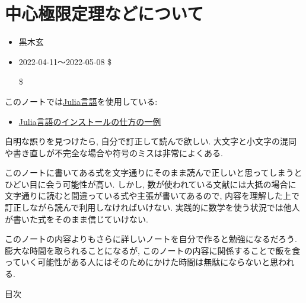 \documentclass[
  letterpaper,
  DIV=11,
  numbers=noendperiod]{scrartcl}
\author{}
\date{}
\providecommand{\tightlist}{%
  \setlength{\itemsep}{0pt}\setlength{\parskip}{0pt}}\usepackage{longtable,booktabs,array}
\begin{document}
\ifdefined\Shaded\renewenvironment{Shaded}{\begin{tcolorbox}[enhanced, breakable, borderline west={3pt}{0pt}{shadecolor}, sharp corners, boxrule=0pt, frame hidden, interior hidden]}{\end{tcolorbox}}\fi

\hypertarget{ux4e2dux5fc3ux6975ux9650ux5b9aux7406ux306aux3069ux306bux3064ux3044ux3066}{%
\section{中心極限定理などについて}\label{ux4e2dux5fc3ux6975ux9650ux5b9aux7406ux306aux3069ux306bux3064ux3044ux3066}}

\begin{itemize}
\tightlist
\item
  黒木玄
\item
  2022-04-11～2022-05-08 \$

  \newcommand\op{\operatorname}
  \newcommand\R{{\mathbb R}}
  \newcommand\Z{{\mathbb Z}}
  \newcommand\var{\op{var}}
  \newcommand\std{\op{std}}
  \newcommand\eps{\varepsilon}
  \newcommand\T[1]{T_{(#1)}}
  \newcommand\bk{\bar\kappa}

  \$
\end{itemize}

このノートでは\href{https://julialang.org/}{Julia言語}を使用している:

\begin{itemize}
\tightlist
\item
  \href{https://nbviewer.org/github/genkuroki/msfd28/blob/master/install.ipynb}{Julia言語のインストールの仕方の一例}
\end{itemize}

自明な誤りを見つけたら, 自分で訂正して読んで欲しい.
大文字と小文字の混同や書き直しが不完全な場合や符号のミスは非常によくある.

このノートに書いてある式を文字通りにそのまま読んで正しいと思ってしまうとひどい目に会う可能性が高い.
しかし,
数が使われている文献には大抵の場合に文字通りに読むと間違っている式や主張が書いてあるので,
内容を理解した上で訂正しながら読んで利用しなければいけない.
実践的に数学を使う状況では他人が書いた式をそのまま信じていけない.

このノートの内容よりもさらに詳しいノートを自分で作ると勉強になるだろう.
膨大な時間を取られることになるが,
このノートの内容に関係することで飯を食っていく可能性がある人にはそのためにかけた時間は無駄にならないと思われる.

目次{}
\end{document}
